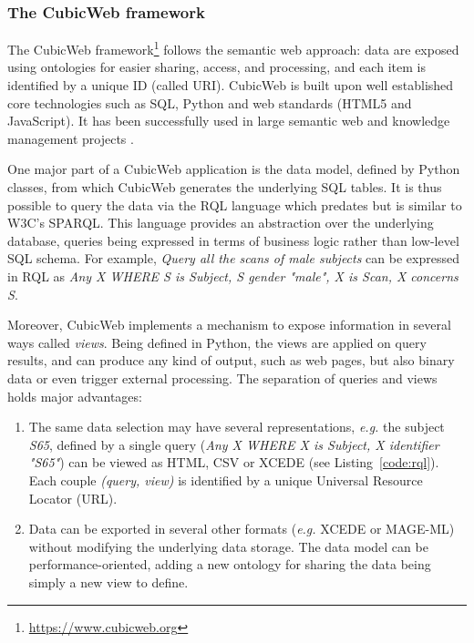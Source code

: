 \documentclass[review]{elsarticle}
\begin{document}
\subsubsection{The CubicWeb framework}
\label{sec:cubicweb}

The CubicWeb framework\footnote{\url{https://www.cubicweb.org}} follows the semantic web approach: data are exposed using ontologies for easier sharing, access, and processing, and each item is identified by a unique ID (called URI). CubicWeb is built upon well established core technologies such as SQL, Python and web standards (HTML5 and JavaScript). It has been successfully used in large semantic web and knowledge management projects \cite{Simon2013}.

One major part of a CubicWeb application is the data model, defined by Python classes, from which CubicWeb generates the underlying SQL tables. It is thus possible to query the data via the RQL language which predates but is similar to W3C's SPARQL. This language provides an abstraction over the underlying database, queries being expressed in terms of business logic rather than low-level SQL schema. For example, \emph{Query all the scans of male subjects} can be expressed in RQL as \emph{Any X WHERE S is Subject, S gender "male", X is Scan, X concerns S}.

Moreover, CubicWeb implements a mechanism to expose information in several ways called \emph{views}. Being defined in Python, the views are applied on query results, and can produce any kind of output, such as web pages, but also binary data or even trigger external processing. The separation of queries and views holds major advantages:
\begin{enumerate}[label=\roman*)]
\item The same data selection may have several representations, \textit{e.g.} the subject \emph{S65}, defined by a single query (\textit{Any X WHERE X is Subject, X identifier "S65"}) can be viewed as HTML, CSV or XCEDE \cite{keator2006general} (see Listing~\ref{code:rql}). Each couple \textit{(query, view)} is identified by a unique Universal Resource Locator (URL).
\item Data can be exported in several other formats (\textit{e.g.} XCEDE or MAGE-ML) without modifying the underlying data storage. The data model can be performance-oriented, adding a new ontology for sharing the data being simply a new view to define.
\end{enumerate}
\end{document}
